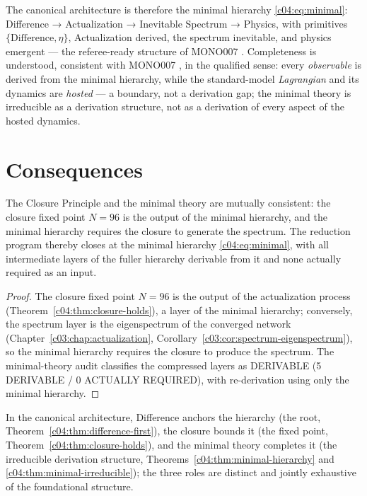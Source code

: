 The canonical architecture is therefore the minimal hierarchy \eqref{c04:eq:minimal}:
Difference → Actualization → Inevitable Spectrum → Physics, with primitives
$\{\text{Difference},\eta\}$, Actualization derived, the spectrum inevitable, and physics
emergent --- the referee-ready structure of MONO007 \cite{c04:MONO007}. Completeness is
understood, consistent with MONO007 \cite{c04:MONO007}, in the qualified sense: every
\emph{observable} is derived from the minimal hierarchy, while the standard-model
\emph{Lagrangian} and its dynamics are \emph{hosted} --- a boundary, not a derivation gap;
the minimal theory is irreducible as a derivation structure, not as a derivation of every
aspect of the hosted dynamics.

\section{Consequences}
\label{c04:sec:closure-consequences}

\begin{theorem}
\label{c04:thm:closure-minimality}
The Closure Principle and the minimal theory are mutually consistent: the closure fixed
point $N=96$ is the output of the minimal hierarchy, and the minimal hierarchy requires the
closure to generate the spectrum. The reduction program thereby closes at the minimal
hierarchy \eqref{c04:eq:minimal}, with all intermediate layers of the fuller hierarchy
derivable from it and none actually required as an input.
\end{theorem}

\begin{proof}
The closure fixed point $N=96$ is the output of the actualization process
(Theorem~\ref{c04:thm:closure-holds}), a layer of the minimal hierarchy; conversely, the
spectrum layer is the eigenspectrum of the converged network (Chapter~\ref{c03:chap:actualization},
Corollary~\ref{c03:cor:spectrum-eigenspectrum}), so the minimal hierarchy requires the closure
to produce the spectrum. The minimal-theory audit \cite{c04:QG294} classifies the compressed
layers as DERIVABLE (5 DERIVABLE / 0 ACTUALLY REQUIRED), with re-derivation using only the
minimal hierarchy.
\end{proof}

In the canonical architecture, Difference anchors the hierarchy (the root,
Theorem~\ref{c04:thm:difference-first}), the closure bounds it (the fixed point,
Theorem~\ref{c04:thm:closure-holds}), and the minimal theory completes it (the irreducible
derivation structure, Theorems~\ref{c04:thm:minimal-hierarchy} and
\ref{c04:thm:minimal-irreducible}); the three roles are distinct and jointly exhaustive of
the foundational structure.

